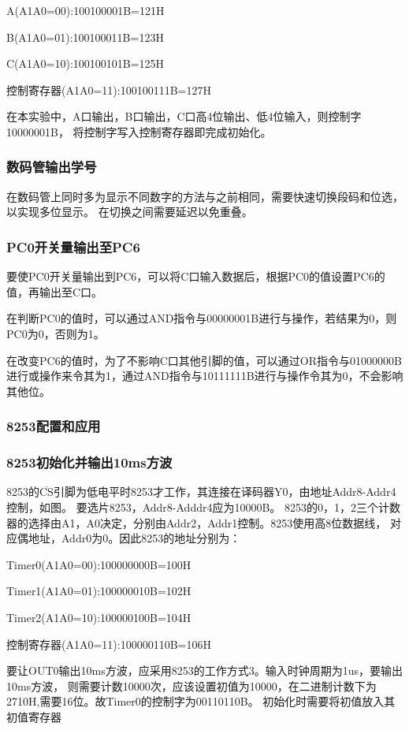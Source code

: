 \documentclass[12pt, a4paper, oneside]{ctexart}
\begin{document}
    
    A(A1A0=00):100100001B=121H

    B(A1A0=01):100100011B=123H

    C(A1A0=10):100100101B=125H

    控制寄存器(A1A0=11):100100111B=127H

    在本实验中，A口输出，B口输出，C口高4位输出、低4位输入，则控制字10000001B，
    将控制字写入控制寄存器即完成初始化。

    \subsubsection{数码管输出学号}
    在数码管上同时多为显示不同数字的方法与之前相同，需要快速切换段码和位选，以实现多位显示。
    在切换之间需要延迟以免重叠。

    \subsubsection{PC0开关量输出至PC6}
    要使PC0开关量输出到PC6，可以将C口输入数据后，根据PC0的值设置PC6的值，再输出至C口。
    
    在判断PC0的值时，可以通过AND指令与00000001B进行与操作，若结果为0，则PC0为0，否则为1。

    在改变PC6的值时，为了不影响C口其他引脚的值，可以通过OR指令与01000000B进行或操作来令其为1，通过AND指令与10111111B进行与操作令其为0，不会影响其他位。
    \subsubsection{8253配置和应用}
    \subsubsection{8253初始化并输出10ms方波}
    8253的$\overline{\text{CS}}$引脚为低电平时8253才工作，其连接在译码器Y0，由地址Addr8-Addr4控制，如图。
    要选片8253，Addr8-Adddr4应为10000B。
    8253的0，1，2三个计数器的选择由A1，A0决定，分别由Addr2，Addr1控制。8253使用高8位数据线，
    对应偶地址，Addr0为0。因此8253的地址分别为：

    Timer0(A1A0=00):100000000B=100H

    Timer1(A1A0=01):100000010B=102H

    Timer2(A1A0=10):100000100B=104H

    控制寄存器(A1A0=11):100000110B=106H

    要让OUT0输出10ms方波，应采用8253的工作方式3。输入时钟周期为1us，要输出10ms方波，
    则需要计数10000次，应该设置初值为10000，在二进制计数下为2710H,需要16位。故Timer0的控制字为00110110B。
    初始化时需要将初值放入其初值寄存器
\end{document}
